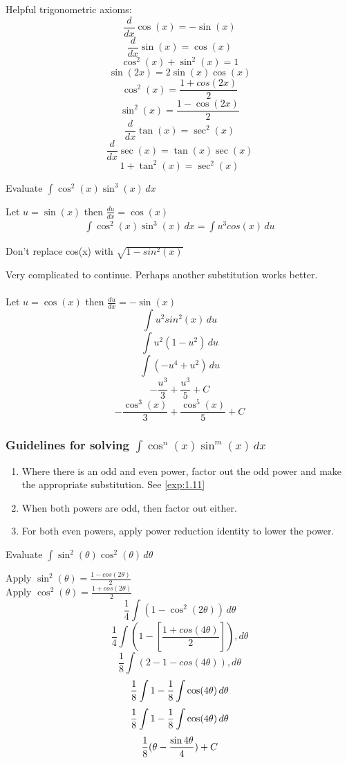 \documentclass[english, 12pt]{article}
\begin{document}
Helpful trigonometric axioms:
\[\frac{d}{dx} \cos(x) = -\sin(x)\]
\[\frac{d}{dx} \sin(x) = \cos(x)\]
\[ \cos^2(x)+ \sin^2(x)=1\]
\[ \sin(2x)=2 \sin(x)\cos(x)\]
\[ \cos^2(x) = \frac{1 + cos(2x)}{2}\]
\[ \sin^2(x) = \frac{1-\cos(2x)}{2}\]
\[\frac{d}{dx} \tan(x) = \sec^2(x)\]
\[\frac{d}{dx} \sec(x) = \tan(x)\sec(x)\]
\[1+\tan^2(x) = \sec^2(x)\]
\begin{exmp}\label{exp:1.11}
Evaluate $\int \cos^2(x)\sin^3(x)\,dx$
\begin{sol}
Let $u=\sin(x)$ then $\frac{du}{dx}=\cos(x)$
\begin{align*}
\int \cos^2(x) \sin^3(x)\,dx = \int u^3 cos(x)\,du
\end{align*}
\begin{note}
Don't replace cos(x) with $\sqrt{1-sin^2(x)}$
\end{note}
Very complicated to continue. Perhaps another substitution works better.\\\\
Let $u=\cos(x)$ then $\frac{du}{dx} = -\sin(x)$
\[ \int u^2 sin^2(x)\, du\]
\[ \int u^2 (1-u^2)\, du\]
\[ \int (-u^4 + u^2)\, du\]
\[ - \frac{u^3}{3} + \frac{u^3}{5} + C \]
\[ - \frac{\cos^3(x)}{3} + \frac{\cos^5(x)}{5} + C \]
\end{sol}
\end{exmp}

\subsubsection*{Guidelines for solving $\int \cos^n(x)\sin^m(x)\,dx$}
\begin{enumerate}
\item Where there is an odd and even power, factor out the odd power and make the appropriate substitution. See \ref{exp:1.11}
\item When both powers are odd, then factor out either.
\item For both even powers, apply power reduction identity to lower the power.
\end{enumerate}

\begin{exercise}
Evaluate $\int\sin^2(\theta)\cos^2(\theta)\, d\theta$

\begin{sol}
Apply $\sin^2(\theta) = \frac{1-cos(2\theta)}{2}$\\
Apply $\cos^2(\theta) = \frac{1+cos(2\theta)}{2}$
\[ \frac 1 4 \int (1-\cos^2(2\theta))\,d\theta\]
\[ \frac 1 4 \int (1 - [\frac{1+cos(4\theta)}{2}]), d\theta \]
\[ \frac 1 8 \int (2 - 1 - cos(4\theta)), d\theta \]
\[ \frac 1 8 \int 1 - \frac{1}{8} \int \cos(4\theta)\,d\theta\]
\[ \frac 1 8 \int 1 - \frac{1}{8} \int \cos(4\theta)\,d\theta\]
\[ \frac{1}{8} (\theta - \frac{\sin 4\theta}{4}) + C \]
\end{sol}
\end{exercise}
\end{document}
